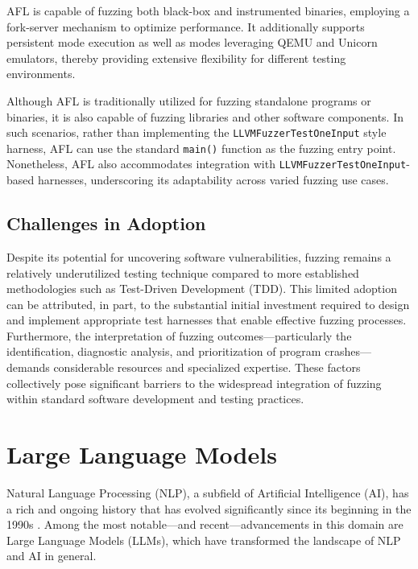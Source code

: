 \documentclass[
  a4paper,
  DIV=11,
  numbers=noendperiod]{scrreprt}
\theoremstyle{definition}
\theoremstyle{remark}
\begin{document}
AFL is capable of fuzzing both black-box and instrumented binaries,
employing a fork-server mechanism to optimize performance. It
additionally supports persistent mode execution as well as modes
leveraging QEMU and Unicorn emulators, thereby providing extensive
flexibility for different testing environments.

Although AFL is traditionally utilized for fuzzing standalone programs
or binaries, it is also capable of fuzzing libraries and other software
components. In such scenarios, rather than implementing the
\texttt{LLVMFuzzerTestOneInput} style harness, AFL can use the standard
\texttt{main()} function as the fuzzing entry point. Nonetheless, AFL
also accommodates integration with \texttt{LLVMFuzzerTestOneInput}-based
harnesses, underscoring its adaptability across varied fuzzing use
cases.

\subsection{Challenges in Adoption}\label{challenges-in-adoption}

Despite its potential for uncovering software vulnerabilities, fuzzing
remains a relatively underutilized testing technique compared to more
established methodologies such as Test-Driven Development (TDD). This
limited adoption can be attributed, in part, to the substantial initial
investment required to design and implement appropriate test harnesses
that enable effective fuzzing processes. Furthermore, the interpretation
of fuzzing outcomes---particularly the identification, diagnostic
analysis, and prioritization of program crashes---demands considerable
resources and specialized expertise. These factors collectively pose
significant barriers to the widespread integration of fuzzing within
standard software development and testing practices.

\section{Large Language Models}\label{large-language-models}

Natural Language Processing (NLP), a subfield of Artificial Intelligence
(AI), has a rich and ongoing history that has evolved significantly
since its beginning in the 1990s \autocite{li2022,wang2025}. Among the
most notable---and recent---advancements in this domain are Large
Language Models (LLMs), which have transformed the landscape of NLP and
AI in general.
\end{document}

